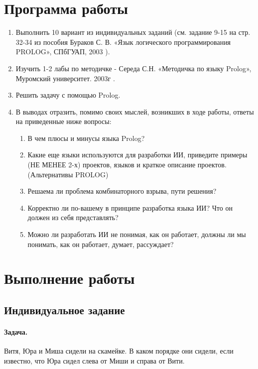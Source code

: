 





\tableofcontents
\newpage

\section{Программа работы}

\begin{enumerate}
	\item Выполнить 10 вариант из индивидуальных заданий (см. задание 9-15 на стр. 32-34 из пособия Бураков С. В. «Язык логического программирования PROLOG», СПбГУАП, 2003 \cite{burakov}).
	\item Изучить 1-2 лабы по методичке - Середа С.Н. «Методичка по языку Prolog», Муромский университет. 2003г \cite{sereda}.
	\item Решить задачу с помощью Prolog.
	\item В выводах отразить, помимо своих мыслей, возникших в ходе работы, ответы на приведенные ниже вопросы:
	\begin{enumerate}
		\item В чем плюсы и минусы языка Prolog?
		\item Какие еще языки используются для разработки ИИ, приведите примеры (НЕ МЕНЕЕ 2-х) проектов, языков и краткое описание проектов. (Альтернативы PROLOG)
		\item Решаема ли проблема комбинаторного взрыва, пути решения?
		\item Корректно ли по-вашему в принципе разработка языка ИИ? Что он должен из себя представлять?
		\item Можно ли разработать ИИ не понимая, как он работает, должны ли мы понимать, как он работает, думает, рассуждает? 
	\end{enumerate}
\end{enumerate}

\section{Выполнение работы}

\subsection{Индивидуальное задание}

\paragraph{Задача.} Витя, Юра и Миша сидели на скамейке. В каком порядке они
сидели, если известно, что Юра сидел слева от Миши и справа от Вити.

